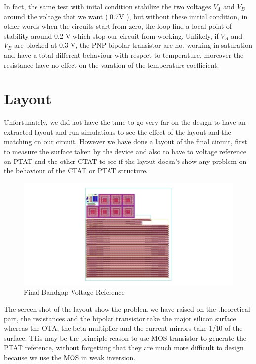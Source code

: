 \documentclass[11pt,a4paper]{report}
\begin{document}
In fact, the same test with inital condition stabilize the two voltages $V_A$ and $V_B$ around the voltage that we want ( 0.7V ), but without these initial condition, in other words when the circuits start from zero, the loop find a local point of stability around 0.2 V which stop our circuit from working. Unlikely, if $V_A$ and $V_B$ are blocked at 0.3 V, the PNP bipolar transistor are not working in saturation and have a total different behaviour with respect to temperature, moreover the resistance have no effect on the varation of the temperature coefficient.

\section{Layout}

Unfortunately, we did not have the time to go very far on the design to have an extracted layout and run simulations to see the effect of the layout and the matching on our circuit. However we have done a layout of the final circuit, first to measure the surface taken by the device and also to have to voltage reference on PTAT and the other CTAT to see if the layout doesn't show any problem on the behaviour of the CTAT or PTAT structure.

\begin{figure}[h]
  \begin{center}
    \includegraphics[scale=0.4]{photo/Layout-ex.jpg}
  \end{center}
  \caption{Final Bandgap Voltage Reference}
\end{figure} 

The screen-shot of the layout show the problem we have raised on the theoretical part, the resistances and the bipolar transistor take the major silicon surface whereas the OTA, the beta multiplier and the current mirrors take 1/10 of the surface. This may be the principle reason to use MOS transistor to generate the PTAT reference, without forgetting that they are much more difficult to design because we use the MOS in weak inversion. 
\end{document}
